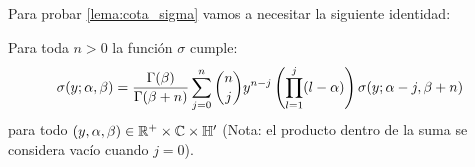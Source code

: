 Para probar \ref{lema:cota_sigma} vamos a necesitar la siguiente identidad:

\begin{lema}\label{lema:integrar_partes_sigma}%
  Para toda $n>0$ la funci\'on $\sigma$ cumple:
  \begin{equation}\label{eq:int_partes_sigma}
    \sigma(y;\alpha,\beta)=
    \frac{\Gamma(\beta)}{\Gamma(\beta+n)}\sum_{j=0}^n
    \binom{n}{j}y^{n-j}\left( \prod_{l=1}^j(l-\alpha) \right)\sigma(y;\alpha-j,\beta+n)
  \end{equation}
  para todo $(y,\alpha,\beta)\in\mathbb{R}^+\times\mathbb{C}\times\mathbb{H}'$ (Nota: el producto dentro de la
  suma se considera vac\'io cuando $j=0$).
\end{lema}%
